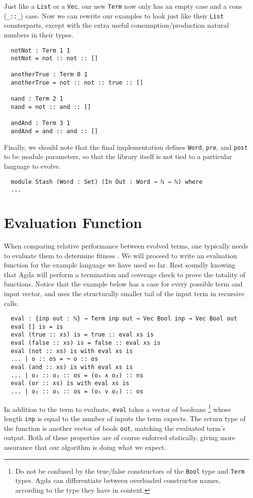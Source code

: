 \documentclass[runningheads,a4paper]{llncs}
\begin{document}
Just like a \texttt{List} or a \texttt{Vec}, our new \texttt{Term} now
only has an empty case and a cons (\texttt{\_::\_}) case. Now we can
rewrite our examples to look just like their \texttt{List}
counterparts, except with the extra useful consumption/production
natural numbers in their types.

\begin{verbatim}
  notNot : Term 1 1
  notNot = not :: not :: []

  anotherTrue : Term 0 1
  anotherTrue = not :: not :: true :: []

  nand : Term 2 1
  nand = not :: and :: []

  andAnd : Term 3 1
  andAnd = and :: and :: []
\end{verbatim}

Finally, we should note that the final implementation defines
\texttt{Word}, \texttt{pre}, and \texttt{post} to be module
parameters, so that the library itself is not tied to a particular
language to evolve.

\begin{verbatim}
  module Stash (Word : Set) (In Out : Word → ℕ → ℕ) where
  ...
\end{verbatim}

\section{Evaluation Function}

When comparing relative performance between evolved terms, one
typically needs to evaluate them to determine fitness . We will
proceed to write an evaluation function for the example language we
have used so far. Rest soundly knowing that Agda will perform a termination and
coverage check to prove the totality of functions. Notice that the
example below has a case for every possible term and input vector, and
uses the structurally smaller tail of the input term in recursive
calls.

\begin{verbatim}
  eval : {inp out : ℕ} → Term inp out → Vec Bool inp → Vec Bool out
  eval [] is = is
  eval (true :: xs) is = true :: eval xs is
  eval (false :: xs) is = false :: eval xs is
  eval (not :: xs) is with eval xs is
  ... | o :: os = ¬ o :: os
  eval (and :: xs) is with eval xs is
  ... | o₂ :: o₁ :: os = (o₁ ∧ o₂) :: ns
  eval (or :: xs) is with eval xs is
  ... | o₂ :: o₁ :: os = (o₁ ∨ o₂) :: os
\end{verbatim}

In addition to the term to evaluate, \texttt{eval} takes a vector of
booleans \footnote{Do not be confused by the true/false constructors
  of the \texttt{Bool} type and \texttt{Term} types. Agda can
  differentiate between overloaded constructor names, according to the
  type they have in context.}
whose length \texttt{inp} is equal to the number of inputs the
term expects. The return type of the function is another vector of
bools \texttt{out}, matching the evaluated term's output. Both of these
properties are of course enforced statically, giving more assurance that
our algorithm is doing what we expect.
\end{document}
